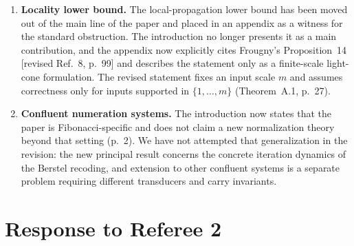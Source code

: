 \documentclass[11pt]{article}
\begin{document}
\begin{enumerate}[leftmargin=*]
\item \textbf{Locality lower bound.}
The local-propagation lower bound has been moved out of the main line of the
paper and placed in an appendix as a witness for the standard obstruction.
The introduction no longer presents it as a main contribution, and the
appendix now explicitly cites Frougny's Proposition~14 [revised Ref.~8,
p.~99] and describes the
statement only as a finite-scale light-cone formulation.  The revised
statement fixes an input scale $m$ and assumes correctness only for inputs
supported in $\{1,\ldots,m\}$ (Theorem~A.1, p.~27).

\item \textbf{Confluent numeration systems.}
The introduction now states that the paper is Fibonacci-specific and does not
claim a new normalization theory beyond that setting (p.~2).
We have not attempted that generalization in the revision: the new principal
result concerns the concrete iteration dynamics of the Berstel recoding, and
extension to other confluent systems is a separate problem requiring different
transducers and carry invariants.
\end{enumerate}

\section*{Response to Referee 2}
\end{document}
